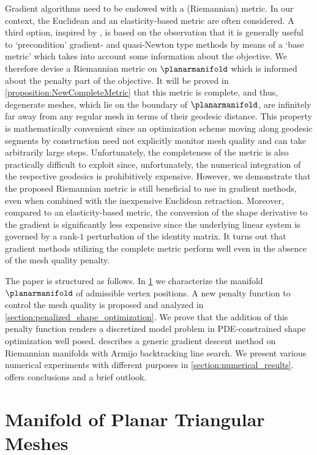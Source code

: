 Gradient algorithms need to be endowed with a (Riemannian) metric. In our context, the Euclidean and an elasticity-based metric are often considered.
A third option, inspired by \cite{HerzogLoayzaRomero:2022:1}, is based on the observation that 
it is generally useful to `precondition' gradient- and quasi-Newton type methods by means of a `base metric' which takes into account some information about the objective.
We therefore devise a Riemannian metric on $\planarmanifold$ which is informed about the penalty part of the objective.
It will be proved in \cref{proposition:NewCompleteMetric} that this metric is complete, and thus, degenerate meshes, which lie on the boundary of $\planarmanifold$, are infinitely far away from any regular mesh in terms of their geodesic distance.
This property is mathematically convenient since an optimization scheme moving along geodesic segments by construction need not explicitly monitor mesh quality and can take arbitrarily large steps.
Unfortunately, the completeness of the metric is also practically difficult to exploit since, unfortunately, the numerical integration of the respective geodesics is prohibitively expensive.
However, we demonstrate that the proposed Riemannian metric is still beneficial to use in gradient methods, even when combined with the inexpensive Euclidean retraction.
Moreover, compared to an elasticity-based metric, the conversion of the shape derivative to the gradient is significantly less expensive since the underlying linear system is governed by a rank-$1$ perturbation of the identity matrix.
It turns out that gradient methods utilizing the complete metric perform well even in the absence of the mesh quality penalty.

The paper is structured as follows.
In \cref{section:manifold_planar_triangular_meshes} we characterize the manifold $\planarmanifold$ of admissible vertex positions.
A new penalty function to control the mesh quality is proposed and analyzed in \cref{section:penalized_shape_optimization}.
We prove that the addition of this penalty function renders a discretized model problem in PDE-constrained shape optimization well posed.
 describes a generic gradient descent method on Riemannian manifolds with Armijo backtracking line search.
We present various numerical experiments with different purposes in \cref{section:numerical_results}.
 offers conclusions and a brief outlook.


\section{Manifold of Planar Triangular Meshes}
\label{section:manifold_planar_triangular_meshes}

